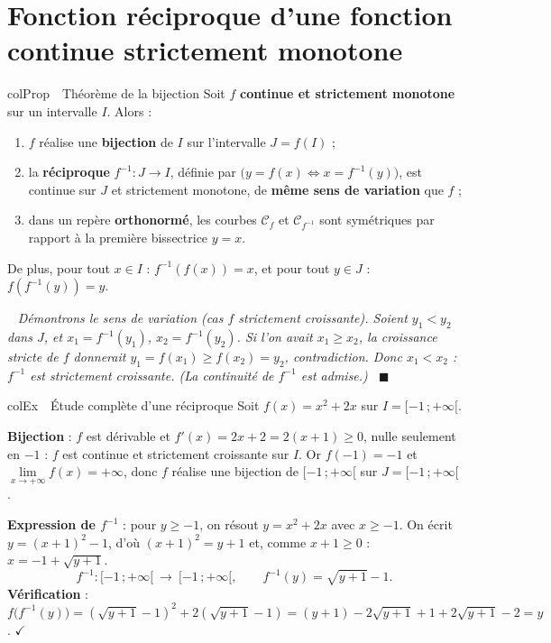 \documentclass[11pt,a4paper]{article}
\newenvironment{propriete}[1][Propriété]
  {\begin{fiche}{colProp}{\ding{72}~~#1}}{\end{fiche}}
\newenvironment{exemple}[1][Exemple]
  {\begin{fiche}{colEx}{\ding{217}~~#1}}{\end{fiche}}
\newenvironment{demo}
  {\par\smallskip\noindent{\sffamily\bfseries\color{qtealdark}Démonstration.}\ \itshape}
  {\ \normalfont\hfill$\blacksquare$\par\medskip}
\begin{document}
\section{Fonction réciproque d'une fonction continue strictement monotone}

\begin{propriete}[Théorème de la bijection]
Soit $f$ \textbf{continue et strictement monotone} sur un intervalle $I$. Alors :
\begin{enumerate}[leftmargin=7mm, itemsep=0.5mm]
  \item $f$ réalise une \textbf{bijection} de $I$ sur l'intervalle $J = f(I)$ ;
  \item la \textbf{réciproque} $f^{-1} : J \to I$, définie par $\bigl(y = f(x) \iff x = f^{-1}(y)\bigr)$, est continue sur $J$ et strictement monotone, de \textbf{même sens de variation} que $f$ ;
  \item dans un repère \textbf{orthonormé}, les courbes $\mathcal{C}_f$ et $\mathcal{C}_{f^{-1}}$ sont symétriques par rapport à la première bissectrice $y = x$.
\end{enumerate}
De plus, pour tout $x \in I$ : $f^{-1}(f(x)) = x$, et pour tout $y \in J$ : $f(f^{-1}(y)) = y$.
\end{propriete}

\begin{demo}
Démontrons le sens de variation (cas $f$ strictement croissante). Soient $y_1 < y_2$ dans $J$, et $x_1 = f^{-1}(y_1)$, $x_2 = f^{-1}(y_2)$. Si l'on avait $x_1 \geq x_2$, la croissance stricte de $f$ donnerait $y_1 = f(x_1) \geq f(x_2) = y_2$, contradiction. Donc $x_1 < x_2$ : $f^{-1}$ est strictement croissante. (La continuité de $f^{-1}$ est admise.)
\end{demo}

\begin{exemple}[Étude complète d'une réciproque]
Soit $f(x) = x^2 + 2x$ sur $I = [-1\,;+\infty[$.

\smallskip
\textbf{Bijection} : $f$ est dérivable et $f'(x) = 2x + 2 = 2(x + 1) \geq 0$, nulle seulement en $-1$ : $f$ est continue et strictement croissante sur $I$. Or $f(-1) = -1$ et $\lim\limits_{x \to +\infty} f(x) = +\infty$, donc $f$ réalise une bijection de $[-1\,;+\infty[$ sur $J = [-1\,;+\infty[$.

\smallskip
\textbf{Expression de $f^{-1}$} : pour $y \geq -1$, on résout $y = x^2 + 2x$ avec $x \geq -1$. On écrit $y = (x + 1)^2 - 1$, d'où $(x + 1)^2 = y + 1$ et, comme $x + 1 \geq 0$ : $x = -1 + \sqrt{y + 1}$.
\[
  f^{-1} : [-1\,;+\infty[\ \to\ [-1\,;+\infty[, \qquad f^{-1}(y) = \sqrt{y + 1} - 1.
\]
\textbf{Vérification} : $f\bigl(f^{-1}(y)\bigr) = (\sqrt{y+1} - 1)^2 + 2(\sqrt{y+1} - 1) = (y + 1) - 2\sqrt{y+1} + 1 + 2\sqrt{y+1} - 2 = y$. $\checkmark$
\end{exemple}
\end{document}
